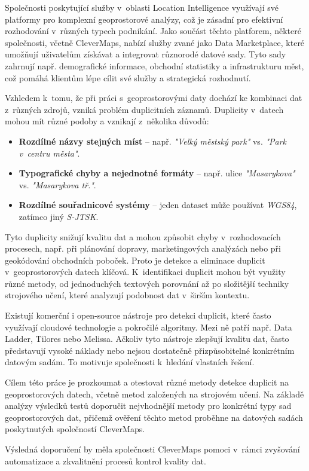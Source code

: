 Společnosti poskytující služby v~oblasti Location Intelligence využívají své platformy pro komplexní geoprostorové analýzy, což je zásadní pro efektivní rozhodování v~různých typech podnikání. Jako součást těchto platforem, některé společnosti, včetně CleverMaps, nabízí služby zvané jako Data Marketplace, které umožňují uživatelům získávat a integrovat různorodé datové sady. Tyto sady zahrnují např. demografické informace, obchodní statistiky a infrastrukturu měst, což pomáhá klientům lépe cílit své služby a strategická rozhodnutí. \cite{clevermaps_location_2024}

Vzhledem k~tomu, že při práci s~geoprostorovými daty dochází ke kombinaci dat z~různých zdrojů, vzniká problém duplicitních záznamů. Duplicity v~datech mohou mít různé podoby a vznikají z~několika důvodů:

\begin{itemize}
  \item \textbf{Rozdílné názvy stejných míst} – např. \textit{"Velký městský park"} vs. \textit{"Park v~centru města"}.
  \item \textbf{Typografické chyby a nejednotné formáty} – např. ulice \textit{"Masarykova"} vs. \textit{"Masarykova tř."}.
  \item \textbf{Rozdílné souřadnicové systémy} – jeden dataset může používat \textit{WGS84}, zatímco jiný \textit{S-JTSK}.
\end{itemize}

Tyto duplicity snižují kvalitu dat a mohou způsobit chyby v~rozhodovacích procesech, např. při plánování dopravy, marketingových analýzách nebo při geokódování obchodních poboček. Proto je detekce a eliminace duplicit v~geoprostorových datech klíčová. K~identifikaci duplicit mohou být využity různé metody, od jednoduchých textových porovnání až po složitější techniky strojového učení, které analyzují podobnost dat v~širším kontextu. \cite{nauman_introduction_2022, christen_data_2012}

Existují komerční i open-source nástroje pro detekci duplicit, které často využívají cloudové technologie a pokročilé algoritmy. Mezi ně patří např. Data Ladder, Tilores nebo Melissa. Ačkoliv tyto nástroje zlepšují kvalitu dat, často představují vysoké náklady nebo nejsou dostatečně přizpůsobitelné konkrétním datovým sadám. To motivuje společnosti k~hledání vlastních řešení. \cite{christen_data_2012}

Cílem této práce je prozkoumat a otestovat různé metody detekce duplicit na geoprostorových datech, včetně metod založených na strojovém učení. Na základě analýzy výsledků testů doporučit nejvhodnější metody pro konkrétní typy sad geoprostorových dat, přičemž ověření těchto metod proběhne na datových sadách poskytnutých společností CleverMaps.

Výsledná doporučení by měla společnosti CleverMaps pomoci v~rámci zvyšování automatizace a zkvalitnění procesů kontrol kvality dat.
